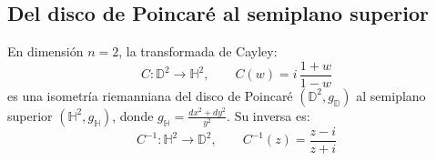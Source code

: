 \subsection{Del disco de Poincaré al semiplano superior}\label{subsec:isometria_poincare_semiplano}

\begin{theorem}\label{thm:isometria_poincare_semiplano}
En dimensión $n = 2$, la transformada de Cayley:
\begin{equation}\label{eq:transformada_cayley}
C: \mathbb{D}^2 \to \mathbb{H}^2, \qquad C(w) = i\,\frac{1+w}{1-w}
\end{equation}
es una isometría riemanniana del disco de Poincaré $(\mathbb{D}^2, g_{\mathbb{D}})$ al semiplano superior $(\mathbb{H}^2, g_{\mathbb{H}})$, donde $g_{\mathbb{H}} = \frac{dx^2 + dy^2}{y^2}$. Su inversa es:
\begin{equation}\label{eq:cayley_inversa}
C^{-1}: \mathbb{H}^2 \to \mathbb{D}^2, \qquad C^{-1}(z) = \frac{z - i}{z + i}
\end{equation}
\end{theorem}

